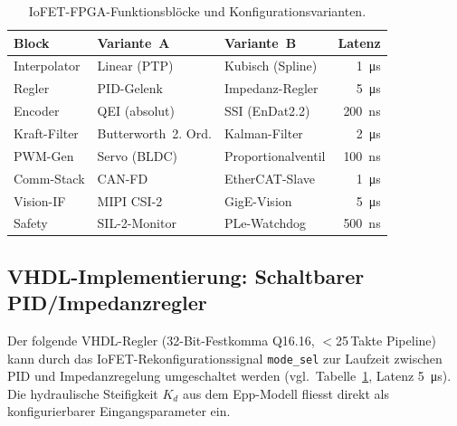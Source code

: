 ﻿\documentclass[a4paper,12pt]{scrreprt}
\theoremstyle{definition}
\begin{document}
\begin{table}[H]
\centering
\caption{IoFET-FPGA-Funktionsblöcke und Konfigurationsvarianten.}
\label{tab:fpga_blocks}
\small
\begin{tabularx}{\linewidth}{|l|l|X|r|}
\hline
\rowcolor{iofetblue!20}
\textbf{Block} & \textbf{Variante~A} & \textbf{Variante~B} & \textbf{Latenz} \\
\hline
Interpolator & Linear (PTP) & Kubisch (Spline) & \SI{1}{\micro\second} \\
\hline
Regler & PID-Gelenk & Impedanz-Regler & \SI{5}{\micro\second} \\
\hline
Encoder & QEI (absolut) & SSI (EnDat2.2) & \SI{200}{\nano\second} \\
\hline
Kraft-Filter & Butterworth~2. Ord. & Kalman-Filter & \SI{2}{\micro\second} \\
\hline
PWM-Gen & Servo (BLDC) & Proportionalventil & \SI{100}{\nano\second} \\
\hline
Comm-Stack & CAN-FD & EtherCAT-Slave & \SI{1}{\micro\second} \\
\hline
Vision-IF & MIPI CSI-2 & GigE-Vision & \SI{5}{\micro\second} \\
\hline
Safety & SIL-2-Monitor & PLe-Watchdog & \SI{500}{\nano\second} \\
\hline
\end{tabularx}
\end{table}

\subsection{VHDL-Implementierung: Schaltbarer PID/Impedanzregler}

Der folgende VHDL-Regler (32-Bit-Festkomma Q16.16, $<$25\,Takte Pipeline)
kann durch das IoFET-Rekonfigurationssignal \texttt{mode\_sel}
zur Laufzeit zwischen PID und Impedanzregelung umgeschaltet werden
(vgl.~Tabelle~\ref{tab:fpga_blocks}, Latenz \SI{5}{\micro\second}).
Die hydraulische Steifigkeit $K_d$ aus dem Epp-Modell fliesst direkt
als konfigurierbarer Eingangsparameter ein.
\end{document}
